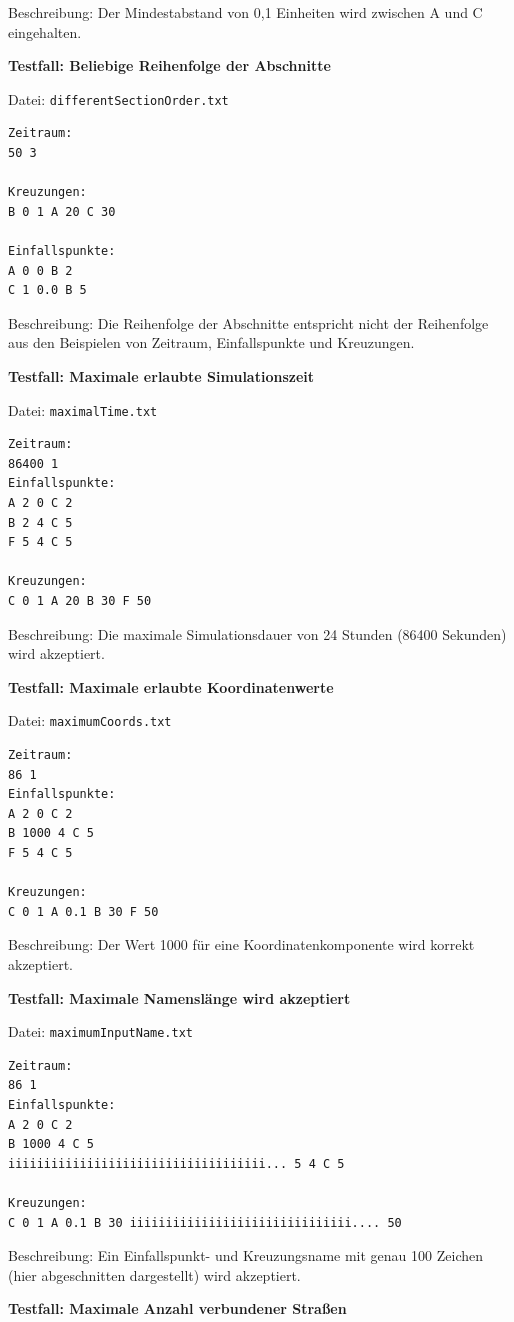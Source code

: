 Beschreibung: Der Mindestabstand von 0{,}1 Einheiten wird zwischen A und C eingehalten.

\textbf{Testfall: Beliebige Reihenfolge der Abschnitte}

Datei: \texttt{differentSectionOrder.txt}
\begin{lstlisting}
Zeitraum:
50 3

Kreuzungen:
B 0 1 A 20 C 30

Einfallspunkte:
A 0 0 B 2
C 1 0.0 B 5
\end{lstlisting}

Beschreibung: Die Reihenfolge der Abschnitte entspricht nicht der Reihenfolge aus den Beispielen von Zeitraum, Einfallspunkte und Kreuzungen.

\textbf{Testfall: Maximale erlaubte Simulationszeit}

Datei: \texttt{maximalTime.txt}
\begin{lstlisting}
Zeitraum:
86400 1
Einfallspunkte:
A 2 0 C 2
B 2 4 C 5
F 5 4 C 5

Kreuzungen:
C 0 1 A 20 B 30 F 50
\end{lstlisting}

Beschreibung: Die maximale Simulationsdauer von 24 Stunden (86400 Sekunden) wird akzeptiert.
\clearpage

\textbf{Testfall: Maximale erlaubte Koordinatenwerte}

Datei: \texttt{maximumCoords.txt}
\begin{lstlisting}
Zeitraum:
86 1
Einfallspunkte:
A 2 0 C 2
B 1000 4 C 5
F 5 4 C 5

Kreuzungen:
C 0 1 A 0.1 B 30 F 50
\end{lstlisting}

Beschreibung: Der Wert 1000 für eine Koordinatenkomponente wird korrekt akzeptiert.


\textbf{Testfall: Maximale Namenslänge wird akzeptiert}

Datei: \texttt{maximumInputName.txt}
\begin{lstlisting}
Zeitraum:
86 1
Einfallspunkte:
A 2 0 C 2
B 1000 4 C 5
iiiiiiiiiiiiiiiiiiiiiiiiiiiiiiiiiiii... 5 4 C 5

Kreuzungen:
C 0 1 A 0.1 B 30 iiiiiiiiiiiiiiiiiiiiiiiiiiiiiii.... 50
\end{lstlisting}

Beschreibung: Ein Einfallspunkt- und Kreuzungsname mit genau 100 Zeichen (hier abgeschnitten dargestellt) wird akzeptiert.

\clearpage
\textbf{Testfall: Maximale Anzahl verbundener Straßen}

